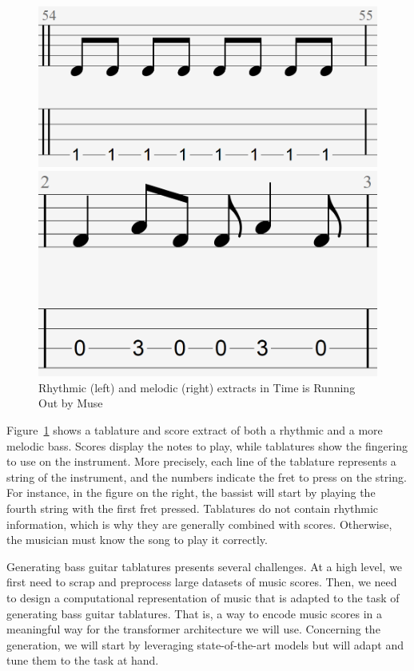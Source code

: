 \begin{figure}[h!]
    \centering
    \begin{minipage}{0.45\textwidth}
        \centering
        \includegraphics[width=.5\linewidth]{../images-figures/rhythmic_tab_TIRO.png}
    \end{minipage}%
    \hfill
    \begin{minipage}{0.45\textwidth}
        \centering
        \includegraphics[width=.5\linewidth]{../images-figures/melodic_tab_TIRO.png}
    \end{minipage}
    \caption{Rhythmic (left) and melodic (right) extracts in Time is Running Out by Muse}
    \label{fig:bass_tab_TIRO}
\end{figure}


Figure~\ref{fig:bass_tab_TIRO} shows a tablature and score extract of both a rhythmic and a more melodic bass.
Scores display the notes to play, while tablatures show the fingering to use on the instrument.
More precisely, each line of the tablature represents a string of the instrument, and the numbers indicate the fret to press on the string.
For instance, in the figure on the right, the bassist will start by playing the fourth string with the first fret pressed.
Tablatures do not contain rhythmic information, which is why they are generally combined with scores.
Otherwise, the musician must know the song to play it correctly.


Generating bass guitar tablatures presents several challenges.
At a high level, we first need to scrap and preprocess large datasets of music scores.
Then, we need to design a computational representation of music that is adapted to the task of generating bass guitar tablatures.
That is, a way to encode music scores in a meaningful way for the transformer architecture we will use.
Concerning the generation, we will start by leveraging state-of-the-art models but will adapt and tune them to the task at hand.